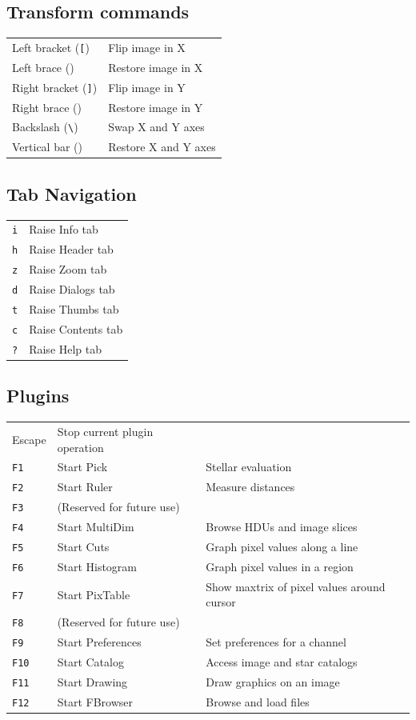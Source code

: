 \documentclass[11pt]{report}
\begin{document}
\subsection{Transform commands}
\begin{tabularx}{\textwidth}{lX}
Left bracket ({\tt [}) & Flip image in X \\
Left brace ({\tt \textbraceleft{}}) & Restore image in X \\
Right bracket ({\tt ]}) & Flip image in Y \\
Right brace ({\tt \textbraceright{}}) & Restore image in Y \\
Backslash ({\tt \textbackslash{}}) & Swap X and Y axes \\
Vertical bar ({\tt \textbar{}}) & Restore X and Y axes \\
\end{tabularx}

\subsection{Tab Navigation}
\begin{tabularx}{\textwidth}{lX}
{\tt i} & Raise Info tab \\
{\tt h} & Raise Header tab \\
{\tt z} & Raise Zoom tab \\
{\tt d} & Raise Dialogs tab \\
{\tt t} & Raise Thumbs tab \\
{\tt c} & Raise Contents tab \\
{\tt ?} & Raise Help tab \\
\end{tabularx}

\subsection{Plugins}
\begin{tabularx}{\textwidth}{llX}
Escape & Stop current plugin operation & \\
{\tt F1} & Start Pick & Stellar evaluation \\
{\tt F2} & Start Ruler & Measure distances \\
{\tt F3} & (Reserved for future use) & \\
{\tt F4} & Start MultiDim & Browse HDUs and image slices \\
{\tt F5} & Start Cuts & Graph pixel values along a line \\
{\tt F6} & Start Histogram & Graph pixel values in a region \\
{\tt F7} & Start PixTable & Show maxtrix of pixel values around cursor \\
{\tt F8} & (Reserved for future use) & \\
{\tt F9} & Start Preferences & Set preferences for a channel \\
{\tt F10} & Start Catalog & Access image and star catalogs \\
{\tt F11} & Start Drawing & Draw graphics on an image \\
{\tt F12} & Start FBrowser & Browse and load files \\
\end{tabularx}
\end{document}
